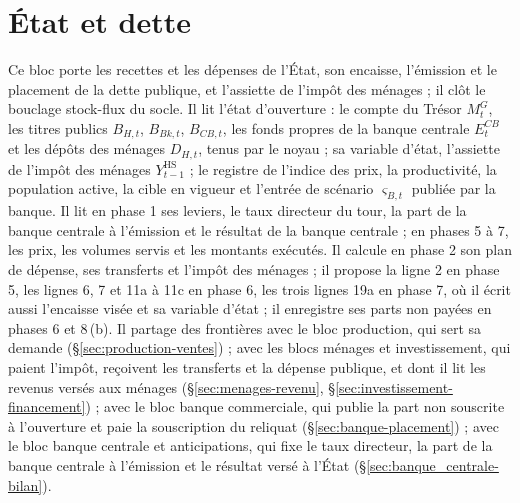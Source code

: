 \documentclass[11pt,a4paper]{article}
\begin{document}
\section{État et dette}
\label{sec:finances_publiques}
Ce bloc porte les recettes et les dépenses de l'État, son encaisse, l'émission et le placement de la dette publique, et l'assiette de l'impôt des ménages ; il clôt le bouclage stock-flux du socle. Il lit l'état d'ouverture : le compte du Trésor $M^G_t$, les titres publics $B_{H,t}$, $B_{\mathit{Bk},t}$, $B_{\mathit{CB},t}$, les fonds propres de la banque centrale $E^{\mathit{CB}}_t$ et les dépôts des ménages $D_{H,t}$, tenus par le noyau ; sa variable d'état, l'assiette de l'impôt des ménages $Y^{\mathrm{HS}}_{t-1}$ ; le registre de l'indice des prix, la productivité, la population active, la cible en vigueur et l'entrée de scénario $\varsigma_{B,t}$ publiée par la banque. Il lit en phase 1 ses leviers, le taux directeur du tour, la part de la banque centrale à l'émission et le résultat de la banque centrale ; en phases 5 à 7, les prix, les volumes servis et les montants exécutés. Il calcule en phase 2 son plan de dépense, ses transferts et l'impôt des ménages ; il propose la ligne 2 en phase 5, les lignes 6, 7 et 11a à 11c en phase 6, les trois lignes 19a en phase 7, où il écrit aussi l'encaisse visée et sa variable d'état ; il enregistre ses parts non payées en phases 6 et 8\,(b). Il partage des frontières avec le bloc production, qui sert sa demande (\S\ref{sec:production-ventes}) ; avec les blocs ménages et investissement, qui paient l'impôt, reçoivent les transferts et la dépense publique, et dont il lit les revenus versés aux ménages (\S\ref{sec:menages-revenu}, \S\ref{sec:investissement-financement}) ; avec le bloc banque commerciale, qui publie la part non souscrite à l'ouverture et paie la souscription du reliquat (\S\ref{sec:banque-placement}) ; avec le bloc banque centrale et anticipations, qui fixe le taux directeur, la part de la banque centrale à l'émission et le résultat versé à l'État (\S\ref{sec:banque_centrale-bilan}).
\end{document}
